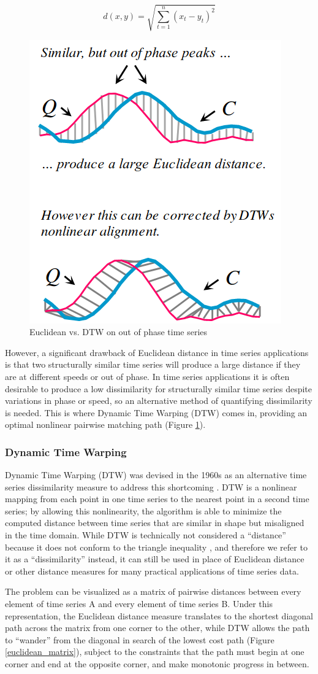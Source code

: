 \documentclass[12pt, letterpaper]{article}
\begin{document}
\begin{equation} \label{euclid}
d(x, y) = \sqrt{\sum_{t=1}^{n}(x_t-y_t)^2}
\end{equation}

\begin{figure}
  \centering
  \includegraphics[height=0.25\textwidth]{img/peaks.png}
  \caption{Euclidean vs. DTW on out of phase time series \cite{rakthanmanon_addressing_2013}}
  \label{peaks}
\end{figure}  

However, a significant drawback of Euclidean distance in time series
applications is that two structurally similar time series will produce a large
distance if they are at different speeds or out of phase. In time series
applications it is often desirable to produce a low dissimilarity for
structurally similar time series despite variations in phase or speed, so an
alternative method of quantifying dissimilarity is needed. This is where Dynamic
Time Warping (DTW) comes in, providing an optimal nonlinear pairwise matching
path (Figure \ref{peaks}).


\subsubsection{Dynamic Time Warping}

Dynamic Time Warping (DTW) was devised in the 1960s as an alternative time
series dissimilarity measure to address this shortcoming
\cite{sakoe_dynamic_1978}. DTW is a nonlinear mapping from each point in one
time series to the nearest point in a second time series; by allowing this
nonlinearity, the algorithm is able to minimize the computed distance
between time series that are similar in shape but misaligned in the time domain.
While DTW is technically not considered a ``distance'' because it does not
conform to the triangle inequality \cite{jain_semi-metrification_2018}, and
therefore we refer to it as a ``dissimilarity'' instead, it can still be used in
place of Euclidean distance or other distance measures for many practical
applications of time series data.

The problem can be visualized as a matrix of pairwise distances between every
element of time series A and every element of time series B. Under this
representation, the Euclidean distance measure translates to the shortest
diagonal path across the matrix from one corner to the other, while DTW allows
the path to ``wander'' from the diagonal in search of the lowest cost path
(Figure \ref{euclidean_matrix}), subject to the constraints that the path must
begin at one corner and end at the opposite corner, and make monotonic progress
in between.
\end{document}
